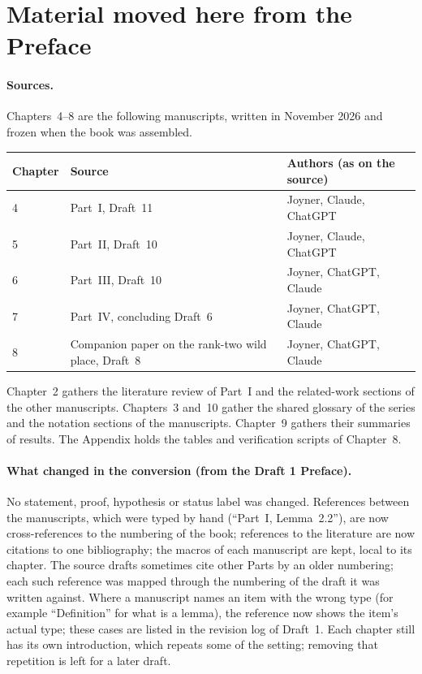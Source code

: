 \documentclass[12pt,letterpaper]{article}
\begin{document}
\section{Material moved here from the Preface}\label{sec:moved}
\paragraph{Sources.} Chapters~4--8 are the following manuscripts, written in November 2026 and frozen when the book was assembled.
\begin{center}\small
\begin{tabular}{@{}lll@{}}\toprule
Chapter & Source & Authors (as on the source)\\\midrule
4 & Part~I, Draft~11 & Joyner, Claude, ChatGPT\\
5 & Part~II, Draft~10 & Joyner, Claude, ChatGPT\\
6 & Part~III, Draft~10 & Joyner, ChatGPT, Claude\\
7 & Part~IV, concluding Draft~6 & Joyner, ChatGPT, Claude\\
8 & Companion paper on the rank-two wild place, Draft~8 & Joyner, ChatGPT, Claude\\
\bottomrule\end{tabular}
\end{center}
Chapter~2 gathers the literature review of Part~I and the related-work sections of the other manuscripts. Chapters~3 and~10 gather the shared glossary of the series and the notation sections of the manuscripts. Chapter~9 gathers their summaries of results. The Appendix holds the tables and verification scripts of Chapter~8.

\paragraph{What changed in the conversion (from the Draft 1 Preface).} No statement, proof, hypothesis or status label was changed. References between the manuscripts, which were typed by hand (``Part~I, Lemma~2.2''), are now cross-references to the numbering of the book; references to the literature are now citations to one bibliography; the macros of each manuscript are kept, local to its chapter. The source drafts sometimes cite other Parts by an older numbering; each such reference was mapped through the numbering of the draft it was written against. Where a manuscript names an item with the wrong type (for example ``Definition'' for what is a lemma), the reference now shows the item's actual type; these cases are listed in the revision log of Draft~1. Each chapter still has its own introduction, which repeats some of the setting; removing that repetition is left for a later draft.
\end{document}
